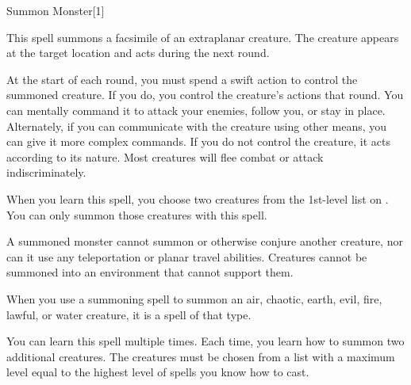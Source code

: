 \begin{spellsection}{Summon Monster}[1]
    \begin{spellheader}
    \end{spellheader}
    \begin{spellcontent}
        \begin{spelltargetinginfo}
        \end{spelltargetinginfo}
        \begin{spelleffects}
            \spelleffect This spell summons a facsimile of an extraplanar creature.
            The creature appears at the target location and acts during the next round.

            At the start of each round, you must spend a swift action to control the summoned creature.
            If you do, you control the creature's actions that round.
            You can mentally command it to attack your enemies, follow you, or stay in place.
            Alternately, if you can communicate with the creature using other means, you can give it more complex commands.
            If you do not control the creature, it acts according to its nature.
            Most creatures will flee combat or attack indiscriminately.

            \spellspecial When you learn this spell, you choose two creatures from the 1st-level list on . You can only summon those creatures with this spell.
            \par A summoned monster cannot summon or otherwise conjure another creature, nor can it use any teleportation or planar travel abilities. Creatures cannot be summoned into an environment that cannot support them.
            \par When you use a summoning spell to summon an air, chaotic, earth, evil, fire, lawful, or water creature, it is a spell of that type.
            \spelldur \durshort \dismissable
        \end{spelleffects}
    \end{spellcontent}
    \begin{spellfooter}
        \spellnotes You can learn this spell multiple times. Each time, you learn how to summon two additional creatures. The creatures must be chosen from a list with a maximum level equal to the highest level of spells you know how to cast.
        \miscastexplode
    \end{spellfooter}
    \begin{spellaugments}
    \end{spellaugments}
\end{spellsection}

